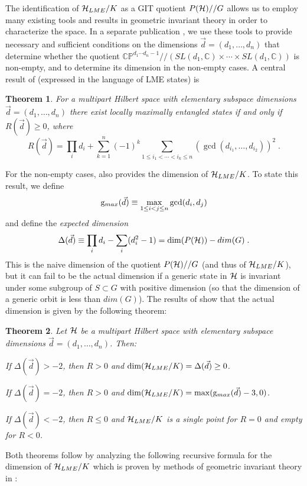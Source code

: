 \documentclass[12pt]{article}
\newtheorem{theorem}{Theorem}[section]
\theoremstyle{definition}
\newcommand{\be}{\begin{equation}}
\newcommand{\ee}{\end{equation}}
\newcommand{\GITquot}{/\!/}
\begin{document}
The identification of ${\cal H}_{LME}/K$ as a GIT quotient $P({\cal H})//G$ allows us to employ many existing tools and results in geometric invariant theory in order to characterize the space. In a separate publication \cite{mathpaper}, we use these tools to provide necessary and sufficient conditions on the dimensions $\vec{d} = (d_1, \dots, d_n)$ that determine whether the quotient $\mathbb{CP}^{d_1 \cdots d_n - 1}\GITquot (SL(d_1, \mathbb{C}) \times \cdots \times SL(d_1, \mathbb{C}))$ is non-empty, and to determine its dimension in the non-empty cases. A central result of \cite{mathpaper} (expressed in the language of LME states) is
\begin{theorem}\label{thm.R}
For a multipart Hilbert space with elementary subspace dimensions $\vec{d} = (d_1, \dots, d_n)$ there exist locally maximally entangled states if and only if $R(\vec{d}) \ge 0$, where 
\be
R(\vec{d}) = \prod_i d_i + \sum_{k=1}^n (-1)^k \sum_{1 \le i_1 < \cdots < i_k \le n} (\gcd(d_{i_1},\dots,d_{i_2}))^2 \; .
\ee
\end{theorem}
For the non-empty cases, \cite{mathpaper} also provides the dimension of ${\cal H}_{LME}/K$. To state this result, we define
\be
\label{gmd}
{\rm g}_{max}(\vec{d}) \equiv \max_{1 \le i < j \le n} \gcd(d_i,d_j)
\ee
and define the {\it expected dimension}
\be
\Delta(\vec{d}) \equiv \prod_i d_i - \sum_i (d_i^2 - 1) = \dim(P({\cal H})) - dim(G) \; .
\ee
This is the naive dimension of the quotient $P({\cal H})//G$ (and thus of ${\cal H}_{LME}/K$), but it can fail to be the actual dimension if a generic state in ${\cal H}$ is invariant under some subgroup of $S \subset G$ with positive dimension (so that the dimension of a generic orbit is less than $dim(G)$). The results of \cite{mathpaper} show that the actual dimension is given by the following theorem:
\begin{theorem}\label{thm.dims}
Let ${\cal H}$ be a multipart Hilbert space with elementary subspace dimensions $\vec{d} = (d_1, \dots, d_n)$. Then:

If $\Delta(\vec{d}) > -2$, then $R > 0$ and $\dim({\cal H}_{LME}/K) = \Delta(\vec{d}) \ge 0$.

If $\Delta(\vec{d}) = -2$, then $R > 0$ and $\dim({\cal H}_{LME}/K)  = \max ({\rm g}_{max}(\vec{d}) -3,0)$.

If $\Delta(\vec{d}) < -2$, then $R \le 0$ and ${\cal H}_{LME}/K$ is a single point for $R=0$ and empty for $R<0$.
\end{theorem}
Both theorems follow by analyzing the following recursive formula for the dimension of ${\cal H}_{LME}/K$ which is proven by methods of geometric invariant theory in \cite{mathpaper}:
\end{document}
